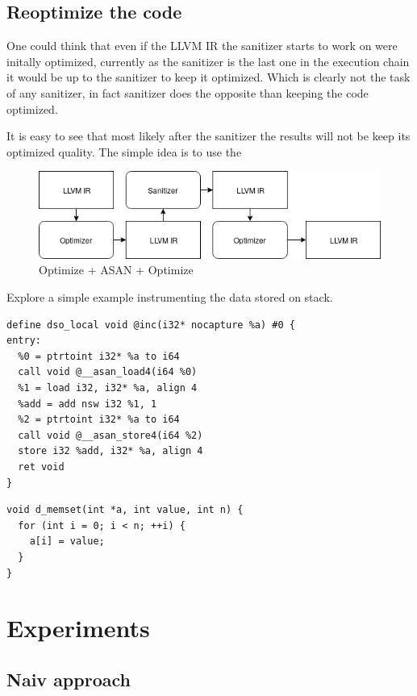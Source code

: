 \documentclass[letterpaper, 10 pt]{llncs}
\begin{document}
\subsection{Reoptimize the code}

One could think that even if the LLVM IR the sanitizer starts to work on were initally optimized, currently as the sanitizer is the last one in the execution chain it would be up to the sanitizer to keep it optimized. Which is clearly not the task of any sanitizer, in fact sanitizer does the opposite than keeping the code optimized.

It is easy to see that most likely after the sanitizer the results will not be keep its optimized quality. The simple idea is to use the 


\begin{figure}[H]
\centering
\includegraphics[scale=0.5]{clang-opt-asan-opt.png}
\caption{Optimize + ASAN + Optimize}
\label{fig:opt-asan-opt}
\end{figure}


Explore a simple example instrumenting the data stored on stack.




\begin{verbatim}
define dso_local void @inc(i32* nocapture %a) #0 {
entry:
  %0 = ptrtoint i32* %a to i64
  call void @__asan_load4(i64 %0)
  %1 = load i32, i32* %a, align 4
  %add = add nsw i32 %1, 1
  %2 = ptrtoint i32* %a to i64
  call void @__asan_store4(i64 %2)
  store i32 %add, i32* %a, align 4
  ret void
}
\end{verbatim}

\begin{verbatim}
void d_memset(int *a, int value, int n) {
  for (int i = 0; i < n; ++i) {
    a[i] = value;
  }
}
\end{verbatim}


\section{Experiments}

\subsection{Naiv approach}
\end{document}
